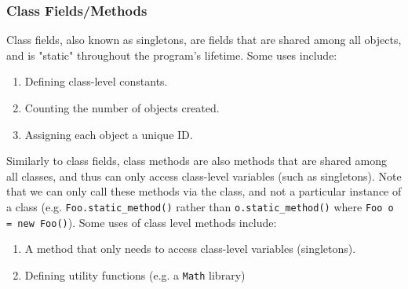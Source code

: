 \documentclass{article}
\begin{document}
\subsubsection{Class Fields/Methods}
Class fields, also known as singletons, are fields that are shared
among all objects, and is "static" throughout the program's
lifetime. Some uses include:
\begin{enumerate}[label=(\roman*)]
\item Defining class-level constants.
\item Counting the number of objects created.
\item Assigning each object a unique ID.
\end{enumerate}
Similarly to class fields, class methods are also methods that are
shared among all classes, and thus can only access class-level
variables (such as singletons). Note that we can only call these
methods via the class, and not a particular instance of a class
(e.g. \texttt{Foo.static\_method()} rather than
\texttt{o.static\_method()} where \texttt{Foo o = new Foo()}). Some
uses of class level methods include:
\begin{enumerate}[label=(\roman*)]
\item A method that only needs to access class-level variables
  (singletons).
\item Defining utility functions (e.g. a \texttt{Math} library)
\end{enumerate}
\end{document}
